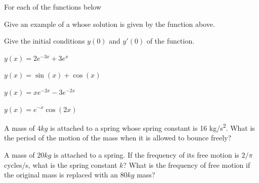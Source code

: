   \begin{question}
    For each of the functions below
    \begin{compactitem}
      \item Give an example of a \ode{} whose solution is given by the function above.
      \item Give the initial conditions \(y(0)\) and \(y'(0)\) of the function.
    \end{compactitem}

    \begin{colenumerate}[2]
      \item \(y(x) = 2e^{-3x} + 3 e^{x}\)
      \item \(y(x) = \sin(x) + \cos(x)\)
      \item \(y(x) = xe^{-2x} -3 e^{-2x}\)
      \item \(y(x) = e^{-x}\cos(2x)\)
    \end{colenumerate}
  \end{question}


  \begin{question}
    A mass of  \(4 \si{kg}\) is attached to a spring whose spring constant is 16 \si{kg/s^2}.
    What is the period of the motion of the mass when it is allowed to bounce freely?
  \end{question}

  \begin{question}
    A mass of \(20 \si{kg}\) is attached to a spring. If the frequency of its free motion is $2/\pi$ cycles/s,
    what is the spring constant $k$? What is the frequency of free motion if the original mass is replaced with an \(80 \si{kg}\) mass?
  \end{question}







